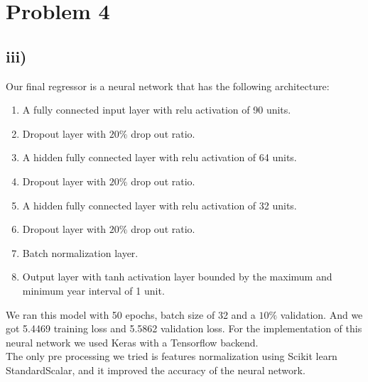 \documentclass[]{homework}
\begin{document}
\section*{Problem 4}
\subsection*{iii)}
Our final regressor is a neural network that has the following architecture:
\begin{enumerate}
    \item A fully connected input layer with relu activation of 90 units.
    \item Dropout layer with $20\%$ drop out ratio. 
    \item A hidden fully connected layer with relu activation of 64 units. 
    \item Dropout layer with $20\%$ drop out ratio.
    \item A hidden fully connected layer with relu activation of 32 units. 
    \item Dropout layer with $20\%$ drop out ratio.
    \item Batch normalization layer.
    \item Output layer with tanh activation layer bounded by the maximum and minimum year interval of 1 unit.
\end{enumerate}

We ran this model with 50 epochs, batch size of 32 and a $10\%$ validation. And we got 5.4469 training loss and 5.5862 validation loss. For the implementation of this neural network we used Keras\cite{chollet2015keras} with a Tensorflow\cite{tensorflow2015-whitepaper} backend. \\

The only pre processing we tried is features normalization using Scikit learn\cite{scikit-learn}\\ StandardScalar, and it improved the accuracy of the neural network.\\
\end{document}
